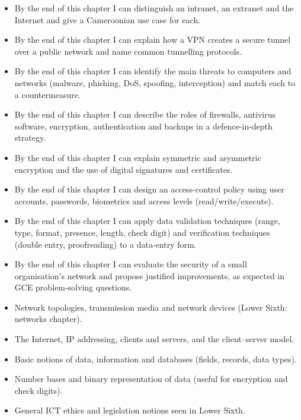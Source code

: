 \documentclass[11pt]{article}
\begin{document}
\begin{objectifs}
\begin{itemize}
\item By the end of this chapter I can distinguish an intranet, an extranet and the Internet and give a Cameroonian use case for each.
\item By the end of this chapter I can explain how a VPN creates a secure tunnel over a public network and name common tunnelling protocols.
\item By the end of this chapter I can identify the main threats to computers and networks (malware, phishing, DoS, spoofing, interception) and match each to a countermeasure.
\item By the end of this chapter I can describe the roles of firewalls, antivirus software, encryption, authentication and backups in a defence-in-depth strategy.
\item By the end of this chapter I can explain symmetric and asymmetric encryption and the use of digital signatures and certificates.
\item By the end of this chapter I can design an access-control policy using user accounts, passwords, biometrics and access levels (read/write/execute).
\item By the end of this chapter I can apply data validation techniques (range, type, format, presence, length, check digit) and verification techniques (double entry, proofreading) to a data-entry form.
\item By the end of this chapter I can evaluate the security of a small organisation's network and propose justified improvements, as expected in GCE problem-solving questions.
\end{itemize}
\end{objectifs}

\begin{prerequis}
\begin{itemize}
\item Network topologies, transmission media and network devices (Lower Sixth: networks chapter).
\item The Internet, IP addressing, clients and servers, and the client–server model.
\item Basic notions of data, information and databases (fields, records, data types).
\item Number bases and binary representation of data (useful for encryption and check digits).
\item General ICT ethics and legislation notions seen in Lower Sixth.
\end{itemize}
\end{prerequis}
\end{document}
